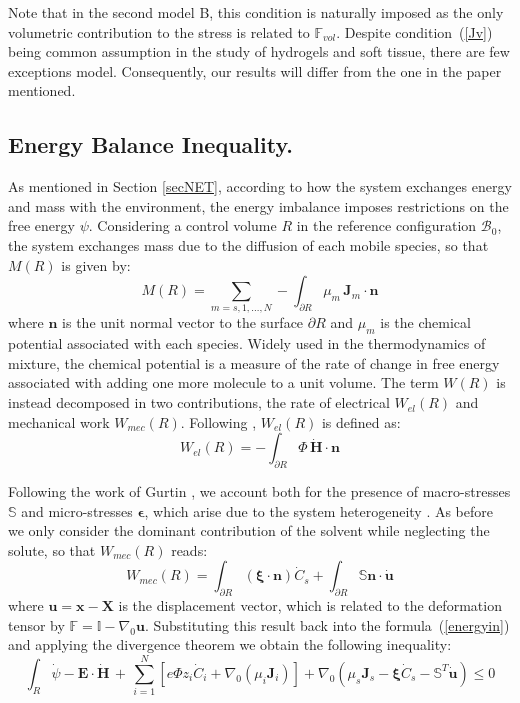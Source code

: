 \documentclass[runningheads]{llncs}
\newcommand{\F}{\ensuremath{\mathbb{F}}}
\begin{document}
Note that in the second model B, this condition is naturally imposed as the only volumetric contribution to the stress is related to $\F_{vol}$.
Despite condition~(\ref{Jv}) being common assumption in the study of hydrogels and soft tissue, there are few exceptions \cite{Article1,CACCAVO2,wang} model. Consequently, our results will differ from the one in the paper mentioned. 
 
\subsection{Energy Balance Inequality.}

As mentioned in Section \ref{secNET}, according to how the system exchanges energy and mass with the environment, the energy imbalance imposes restrictions on the free energy $\psi$. Considering a control volume $R$ in the reference configuration $\mathcal{B}_0$, the system exchanges mass due to the diffusion of each mobile species, so that $M(R)$ is given by:
\begin{equation}
M(R)= \sum\limits_{m=s,1,\ldots,N} - \int_{\partial R} \mu_m \,\mathbf{J}_m \cdot \mathbf{n} 
\end{equation}
where $\mathbf{n}$ is the unit normal vector to the surface $\partial R$ and $\mu_m$ is the chemical potential associated with each species. Widely used in the thermodynamics of mixture, the chemical potential is a measure of the rate of change in free energy associated with adding one more molecule to a unit volume. The term $W(R)$ is instead decomposed in two contributions, the rate of electrical $W_{el}(R)$ and mechanical work $W_{mec}(R)$. Following \cite{DROZDOVph}, $W_{el}(R)$ is defined as:
\begin{equation}
W_{el}(R) = -\int_{\partial R} \Phi\, \dot{\mathbf{H}}\cdot \mathbf{n}
\end{equation}

Following the work of Gurtin \cite{GURTIN}, we account both for the presence of macro-stresses $\mathbb{S}$ and micro-stresses $\boldsymbol{\epsilon}$, which arise due to the system heterogeneity \cite{microstress}. As before we only consider the dominant contribution of the solvent while neglecting the solute, so that $W_{mec}(R)$ reads:
\begin{equation}
W_{mec}(R) = \int_{\partial R} \left(\boldsymbol{\xi}\cdot \mathbf{n}\right)\dot{C}_s + \int_{\partial R} \mathbb{S}\mathbf{n} \cdot \dot{\mathbf{u}}
\end{equation}
where $\mathbf{u}= \mathbf{x}-\mathbf{X}$ is the displacement vector, which is related to the deformation tensor by $\F=\mathbb{I}-\nabla_0 \mathbf{u}$. Substituting this result back into the formula~(\ref{energyin}) and applying the divergence theorem we obtain the following inequality:
\begin{equation}
\int_R \dot{\psi} - \mathbf{E}\cdot \dot{\mathbf{H}} \, + \, \sum\limits_{i=1}^{N} \left[e \Phi  z_i \dot{C}_i+ \nabla_0 \left(\mu_i \mathbf{J}_i \right)\right] + \nabla_0 (\mu_s \mathbf{J}_s- \boldsymbol{\xi}\dot{C}_s -\mathbb{S}^T\mathbf{\dot{u}}) \leq 0 
\end{equation}
\end{document}
